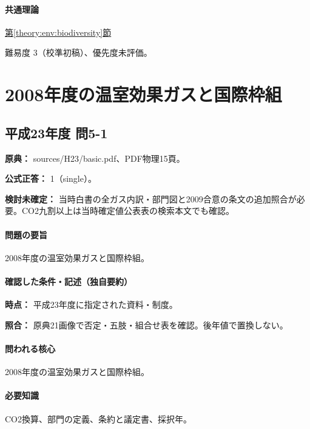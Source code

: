 \paragraph{共通理論} \hyperref[theory:env:biodiversity]{第\ref*{theory:env:biodiversity}節}

\par 難易度 3（校準初稿）、優先度未評価。

\section{2008年度の温室効果ガスと国際枠組}

\subsection{平成23年度 問5-1}
\label{q:h23-reg-basic-5-1}

\noindent\textbf{原典：} sources/H23/basic.pdf、PDF物理15頁。

\textbf{公式正答：} 1（single）。

\par\textbf{検討未確定：} 当時白書の全ガス内訳・部門図と2009合意の条文の追加照合が必要。CO2九割以上は当時確定値公表表の検索本文でも確認。

\paragraph{問題の要旨} 2008年度の温室効果ガスと国際枠組。

\paragraph{確認した条件・記述（独自要約）}\mbox{}\par

\noindent\textbf{時点：} 平成23年度に指定された資料・制度。\par

\noindent\textbf{照合：} 原典21画像で否定・五肢・組合せ表を確認。後年値で置換しない。\par

\paragraph{問われる核心} 2008年度の温室効果ガスと国際枠組。

\paragraph{必要知識} CO2換算、部門の定義、条約と議定書、採択年。

